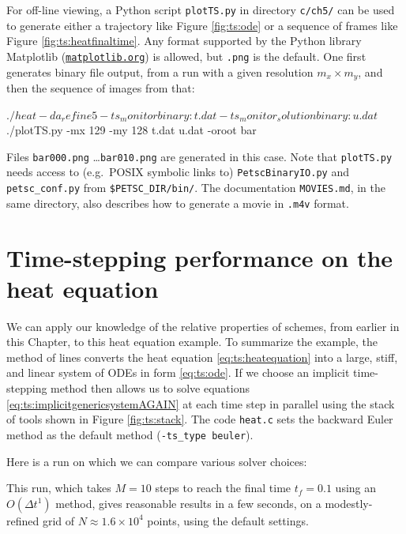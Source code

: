 For off-line viewing, a Python script \texttt{plotTS.py} in directory \texttt{c/ch5/} can be used to generate either a trajectory like Figure \ref{fig:ts:ode} or a sequence of frames like Figure \ref{fig:ts:heatfinaltime}.  Any format supported by the Python library Matplotlib (\href{http://matplotlib.org/}{\texttt{matplotlib.org}}) is allowed, but \texttt{.png} is the default.  One first generates \PETSc binary file output, from a run with a given resolution $m_x \times m_y$, and then the sequence of images from that:
\begin{cline}
$ ./heat -da_refine 5 -ts_monitor binary:t.dat -ts_monitor_solution binary:u.dat
$ ./plotTS.py -mx 129 -my 128 t.dat u.dat -oroot bar
\end{cline}
Files \texttt{bar000.png} \dots \texttt{bar010.png} are generated in this case.  Note that \texttt{plotTS.py} needs access to (e.g.~POSIX symbolic links to) \texttt{PetscBinaryIO.py} and \texttt{petsc\_conf.py} from \texttt{\$PETSC\_DIR/bin/}.  The documentation \texttt{MOVIES.md}, in the same directory, also describes how to generate a movie in \texttt{.m4v} format.


\section{Time-stepping performance on the heat equation}

We can apply our knowledge of the relative properties of schemes, from earlier in this Chapter, to this heat equation example.  To summarize the example, the method of lines converts the heat equation \eqref{eq:ts:heatequation} into a large, stiff, and linear system of ODEs in form \eqref{eq:ts:ode}.  If we choose an implicit time-stepping method then \PETSc allows us to solve equations \eqref{eq:ts:implicitgenericsystemAGAIN} at each time step in parallel using the stack of tools shown in Figure \ref{fig:ts:stack}.  The code \texttt{heat.c} sets the backward Euler method as the default method (\texttt{-ts\_type beuler}).

Here is a run on which we can compare various solver choices:
This run, which takes $M=10$ steps to reach the final time $t_f=0.1$ using an $O(\Delta t^1)$ method, gives reasonable results in a few seconds,  %
on a modestly-refined grid of $N  ^4$ points, using the default settings.

